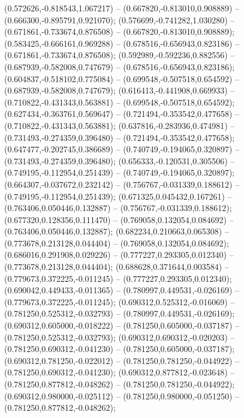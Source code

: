  (0.572626,-0.818543,1.067217) -- (0.667820,-0.813010,0.908889) -- (0.666300,-0.895791,0.921070);
 (0.576699,-0.741282,1.030280) -- (0.671861,-0.733674,0.876508) -- (0.667820,-0.813010,0.908889);
 (0.583425,-0.666161,0.969288) -- (0.678516,-0.656943,0.823186) -- (0.671861,-0.733674,0.876508);
 (0.592989,-0.592236,0.882556) -- (0.687939,-0.582008,0.747679) -- (0.678516,-0.656943,0.823186);
 (0.604837,-0.518102,0.775084) -- (0.699548,-0.507518,0.654592) -- (0.687939,-0.582008,0.747679);
 (0.616413,-0.441908,0.669933) -- (0.710822,-0.431343,0.563881) -- (0.699548,-0.507518,0.654592);
 (0.627434,-0.363761,0.569647) -- (0.721494,-0.353542,0.477658) -- (0.710822,-0.431343,0.563881);
 (0.637816,-0.283936,0.474981) -- (0.731493,-0.274359,0.396480) -- (0.721494,-0.353542,0.477658);
 (0.647477,-0.202745,0.386689) -- (0.740749,-0.194065,0.320897) -- (0.731493,-0.274359,0.396480);
 (0.656333,-0.120531,0.305506) -- (0.749195,-0.112954,0.251439) -- (0.740749,-0.194065,0.320897);
 (0.664307,-0.037672,0.232142) -- (0.756767,-0.031339,0.188612) -- (0.749195,-0.112954,0.251439);
 (0.671325,0.045432,0.167261) -- (0.763406,0.050446,0.132887) -- (0.756767,-0.031339,0.188612);
 (0.677320,0.128356,0.111470) -- (0.769058,0.132054,0.084692) -- (0.763406,0.050446,0.132887);
 (0.682234,0.210663,0.065308) -- (0.773678,0.213128,0.044404) -- (0.769058,0.132054,0.084692);
 (0.686016,0.291908,0.029226) -- (0.777227,0.293305,0.012340) -- (0.773678,0.213128,0.044404);
 (0.688628,0.371644,0.003584) -- (0.779673,0.372225,-0.011245) -- (0.777227,0.293305,0.012340);
 (0.690042,0.449433,-0.011365) -- (0.780997,0.449531,-0.026169) -- (0.779673,0.372225,-0.011245);
 (0.690312,0.525312,-0.016069) -- (0.781250,0.525312,-0.032793) -- (0.780997,0.449531,-0.026169);
 (0.690312,0.605000,-0.018222) -- (0.781250,0.605000,-0.037187) -- (0.781250,0.525312,-0.032793);
 (0.690312,0.690312,-0.020203) -- (0.781250,0.690312,-0.041230) -- (0.781250,0.605000,-0.037187);
 (0.690312,0.781250,-0.022012) -- (0.781250,0.781250,-0.044922) -- (0.781250,0.690312,-0.041230);
 (0.690312,0.877812,-0.023648) -- (0.781250,0.877812,-0.048262) -- (0.781250,0.781250,-0.044922);
 (0.690312,0.980000,-0.025112) -- (0.781250,0.980000,-0.051250) -- (0.781250,0.877812,-0.048262);
